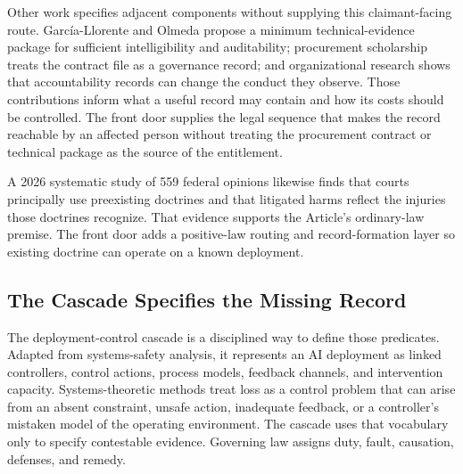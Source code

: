 Other work specifies adjacent components without supplying this claimant-facing route. García-Llorente and Olmeda propose a minimum technical-evidence package for sufficient intelligibility and auditability; procurement scholarship treats the contract file as a governance record; and organizational research shows that accountability records can change the conduct they observe. Those contributions inform what a useful record may contain and how its costs should be controlled. The front door supplies the legal sequence that makes the record reachable by an affected person without treating the procurement contract or technical package as the source of the entitlement.

A 2026 systematic study of 559 federal opinions likewise finds that courts principally use preexisting doctrines and that litigated harms reflect the injuries those doctrines recognize. That evidence supports the Article's ordinary-law premise. The front door adds a positive-law routing and record-formation layer so existing doctrine can operate on a known deployment.

\subsection{The Cascade Specifies the Missing Record}
\label{sec:cascade}

The deployment-control cascade is a disciplined way to define those predicates. Adapted from systems-safety analysis, it represents an AI deployment as linked controllers, control actions, process models, feedback channels, and intervention capacity. Systems-theoretic methods treat loss as a control problem that can arise from an absent constraint, unsafe action, inadequate feedback, or a controller's mistaken model of the operating environment. The cascade uses that vocabulary only to specify contestable evidence. Governing law assigns duty, fault, causation, defenses, and remedy.


